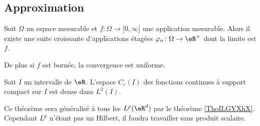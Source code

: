 
\subsection{Approximation}

\begin{lemma}      \label{LempTBaUw}
    Soit \( \Omega\) un espace mesurable et \( f\colon \Omega\to \mathopen[ 0 , \infty \mathclose]\) une application mesurable. Alors il existe une suite croissante d'applications étagées \( \varphi_n\colon \Omega\to \eR^+\) dont la limite est \( f\).

    De plus si \( f\) est bornée, la convergence est uniforme.
\end{lemma}

\begin{theorem}       \label{ThoJsBKir}
    Soit \( I\) un intervalle de \( \eR\). L'espace \( C_c(I)\) des fonctions continues à support compact sur \( I\) est dense dans \( L^2(I)\).
\end{theorem}
Ce théorème sera généralisé à tous les \( L^p(\eR^d)\) par le théorème \ref{ThoILGYXhX}. Cependant \( L^p\) n'étant pas un Hilbert, il faudra travailler sans produit scalaire.

